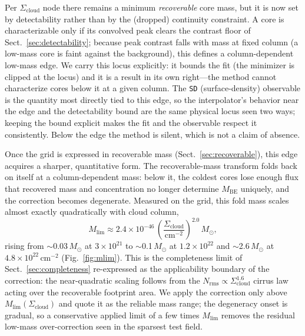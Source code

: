 \documentclass[11pt,a4paper]{article}
\newcommand{\msun}{M_{\odot}}
\newcommand{\Scloud}{\Sigma_{\mathrm{cloud}}}
\begin{document}
Per $\Scloud$ node there remains a minimum \emph{recoverable} core mass, but it
is now set by detectability rather than by the (dropped) continuity constraint.
A core is characterizable only if its convolved peak clears the contrast floor
of Sect.~\ref{sec:detectability}; because peak contrast falls with mass at fixed
column (a low-mass core is faint against the background), this defines a
column-dependent low-mass edge. We carry this locus explicitly: it bounds the
fit (the minimizer is clipped at the locus) and it is a result in its own
right---the method cannot characterize cores below it at a given column. The
\texttt{SD} (surface-density) observable is the quantity most directly tied to
this edge, so the interpolator's behavior near the edge and the detectability
bound are the same physical locus seen two ways; keeping the bound explicit
makes the fit and the observable respect it consistently. Below the edge the
method is silent, which is not a claim of absence.

Once the grid is expressed in recoverable mass (Sect.~\ref{sec:recoverable}),
this edge acquires a sharper, quantitative form. The recoverable-mass
transform folds back on itself at a column-dependent mass: below it, the
coldest cores lose enough flux that recovered mass and concentration no longer
determine $M_{\mathrm{BE}}$ uniquely, and the correction becomes degenerate.
Measured on the grid, this fold mass scales almost exactly quadratically with
cloud column,
\begin{equation}
  M_{\mathrm{lim}} \approx 2.4\times10^{-46}\,
  \left(\frac{\Scloud}{\mathrm{cm^{-2}}}\right)^{2.0}\,\msun,
  \label{eq:mlim}
\end{equation}
rising from $\sim$0.03\,$\msun$ at $3\times10^{21}$ to $\sim$0.1\,$\msun$ at
$1.2\times10^{22}$ and $\sim$2.6\,$\msun$ at $4.8\times10^{22}\,
\mathrm{cm^{-2}}$ (Fig.~\ref{fig:mlim}). This is the completeness limit of
Sect.~\ref{sec:completeness} re-expressed as the applicability boundary of the
correction: the near-quadratic scaling follows from the
$N_{\mathrm{rms}}\propto\Scloud^{1.6}$ cirrus law acting over the recoverable
footprint area. We apply the correction only above $M_{\mathrm{lim}}(\Scloud)$
and quote it as the reliable mass range; the degeneracy onset is gradual, so a
conservative applied limit of a few times $M_{\mathrm{lim}}$ removes the
residual low-mass over-correction seen in the sparsest test field.
\end{document}
